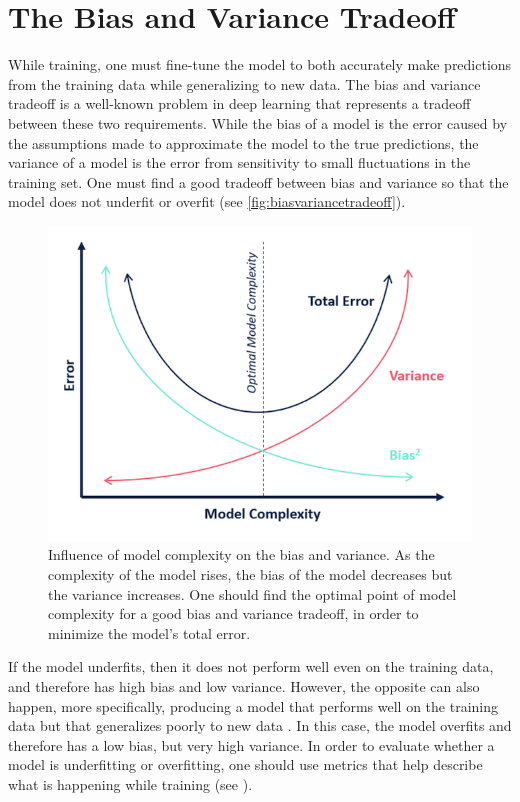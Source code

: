 \section{The Bias and Variance Tradeoff}
\label{section:overfitting_underfitting}
    While training, one must fine-tune the model to both accurately make predictions from the training data while generalizing to new data. The bias and variance tradeoff is a well-known problem in deep learning that represents a tradeoff between these two requirements. While the bias of a model is the error caused by the assumptions made to approximate the model to the true predictions, the variance of a model is the error from sensitivity to small fluctuations in the training set. One must find a good tradeoff between bias and variance so that the model does not underfit or overfit (see \autoref{fig:biasvariancetradeoff}). \par
    
    \begin{figure}[ht]
      \centering
        \includegraphics[width=0.5\linewidth]{figs/bias_variance_tradeoff.png}
      \caption[Influence of model complexity on the bias and variance.]{Influence of model complexity on the bias and variance. As the complexity of the model rises, the bias of the model decreases but the variance increases. One should find the optimal point of model complexity for a good bias and variance tradeoff, in order to minimize the model's total error.}
      \label{fig:biasvariancetradeoff}
    \end{figure}
    
    If the model underfits, then it does not perform well even on the training data, and therefore has high bias and low variance. However, the opposite can also happen, more specifically, producing a model that performs well on the training data but that generalizes poorly to new data \cite{Grus}. In this case, the model overfits and therefore has a low bias, but very high variance. In order to evaluate whether a model is underfitting or overfitting, one should use metrics that help describe what is happening while training (see ). \par  
    
